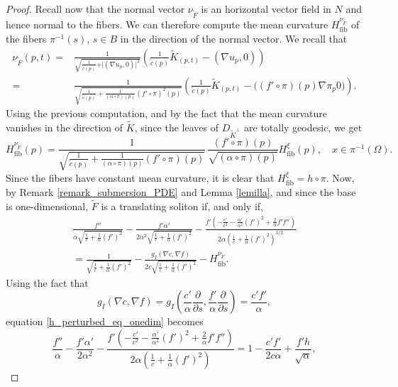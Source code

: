 \documentclass[12pt]{article}
\numberwithin{lemma}{section}
\begin{document}
{\begin{proof}
Recall now that the normal vector $\nu_{\widetilde{F}}$ is an horizontal vector field in $N$ and hence normal to the fibers. We can therefore compute the mean curvature $H_{\mathrm{fib}}^{\nu_{\widetilde{F}}}$ of the fibers $\pi^{-1}(s)$, $s\in B$ in the direction of the normal vector. We recall that 
\begin{align*}\nu_{\widetilde{F}}(p,t)=&
\frac{1}{\sqrt{\frac{1}{\widetilde{c}(p)}+\vert(\nabla u_p,0)\vert^2}}
\left(\frac{1}{\widetilde{c}(p)}\widetilde{K}_{(p,t)}-(\nabla u_p,0)\right) \\
=&\frac{1}{\sqrt{\frac{1}{\tilde{c}(p)}+\frac{1}{(\alpha\circ\pi)(p)}(f'\circ\pi)^2(p)}}
\left(\frac{1}{\tilde{c}(p)}\widetilde{K}_{(p,t)}-\big((f'\circ\pi)(p)\nabla\pi_p0\big)\right). 
\end{align*}
Using the previous computation, and by the fact that the mean curvature vanishes in the direction of $\widetilde{K}$, since the leaves of $D_{\widetilde{K}^{\perp}}$ are totally geodesic, we get
\[H_{\mathrm{fib}}^{\nu_{\widetilde{F}}}(p)=\frac{
1 }{\sqrt{\frac{1}{\tilde{c}(p)}+\frac{1}{(\alpha\circ\pi)(p)}(f'\circ\pi)(p)}}\,
\frac{ (f'\circ\pi)(p)}{\sqrt{(\alpha\circ\pi)(p)}}H_{\mathrm{fib}}^{\xi}(p), \quad x\in\pi^{-1}(\Omega).\]
Since the fibers have constant mean curvature, it is clear that $H_{\mathrm{fib}}^{\xi}=h\circ\pi$. Now, by Remark \ref{remark_submersion_PDE} and Lemma \ref{lemilla}, 
and since the base is one-dimensional, $\widetilde{F}$ is a translating soliton if, and only if, 
\begin{eqnarray}\label{h_perturbed_eq_onedim}
\frac{f''}{\alpha \sqrt{\frac{1}{c}+\frac{1}{\alpha}(f')^2}} 
- \frac{f'\alpha'}{2 \alpha^2 \sqrt{\frac{1}{c}+\frac{1}{\alpha}(f')^2}} - \frac{f'(-\frac{c'}{c^2}-\frac{\alpha'}{\alpha^2}(f')^2+\frac{2}{\alpha}f'f'')}
{2\alpha (\frac{1}{c}+\frac{1}{\alpha}(f')^2)^{3/2}}\nonumber\\
=\frac{1}{ \sqrt{\frac{1}{c}+\frac{1}{\alpha}(f')^2}} 
-\frac{g_I(\nabla c,\nabla f)}{ 2c\sqrt{\frac{1}{c}+\frac{1}{\alpha}(f')^2}} 
-H_{\mathrm{fib}}^{\nu_{\widetilde{F}}}.
\end{eqnarray}
Using the fact that \[g_I(\nabla c,\nabla f)=g_I\left(\frac{c'}{\alpha}\frac{\partial}{\partial s},\frac{f'}{\alpha}\frac{\partial}{\partial s}\right)=\frac{c'f'}{\alpha},\]  
equation \eqref{h_perturbed_eq_onedim} becomes 
\[
\frac{f''}{\alpha}-\frac{f'\alpha'}{2\alpha^2}-\frac{f'(-\frac{c'}{c^2}-\frac{\alpha'}{\alpha^2}(f')^2+\frac{2}{\alpha}f'f'')}{2\alpha(\frac{1}{c}+\frac{1}{\alpha}(f')^2)}=1-\frac{c'f'}{ 2c\alpha} +\frac{f'h}{\sqrt{\alpha}},
\]
\end{proof}}
\end{document}
